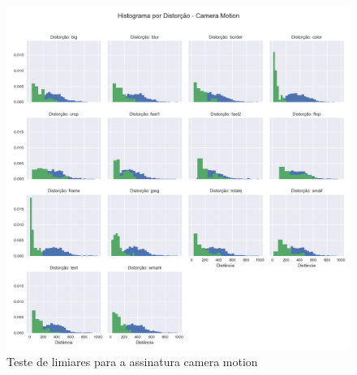 \begin{figure}[h]
	\centering
	\label{fig:limiares-camera-motion}
	\caption{Teste de limiares para a assinatura camera motion}
	\includegraphics[width=\textwidth]{dados/figuras/experimentos/histograma_distorcao_Camera_Motion.png}
\end{figure}

